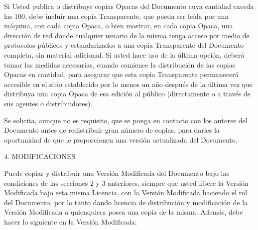 \documentclass[a4paper, 11pt, oneside]{report}
\begin{document}
Si Usted publica o distribuye copias Opacas del Documento cuya cantidad exceda las 100, debe incluir una copia Transparente, que pueda ser leída por una máquina, con cada copia Opaca, o bien mostrar, en cada copia Opaca, una dirección de red donde cualquier usuario de la misma tenga acceso por medio de protocolos públicos y estandarizados a una copia Transparente del Documento completa, sin material adicional. Si usted hace uso de la última opción, deberá tomar las medidas necesarias, cuando comience la distribución de las copias Opacas en cantidad, para asegurar que esta copia Transparente permanecerá accesible en el sitio establecido por lo menos un año después de la última vez que distribuya una copia Opaca de esa edición al público (directamente o a través de sus agentes o distribuidores).

Se solicita, aunque no es requisito, que se ponga en contacto con los autores del Documento antes de redistribuir gran número de copias, para darles la oportunidad de que le proporcionen una versión actualizada del Documento.

4. MODIFICACIONES

Puede copiar y distribuir una Versión Modificada del Documento bajo las condiciones de las secciones 2 y 3 anteriores, siempre que usted libere la Versión Modificada bajo esta misma Licencia, con la Versión Modificada haciendo el rol del Documento, por lo tanto dando licencia de distribución y modificación de la Versión Modificada a quienquiera posea una copia de la misma. Además, debe hacer lo siguiente en la Versión Modificada:
\end{document}
